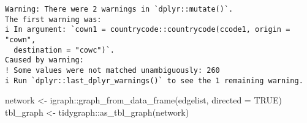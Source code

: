 \documentclass[
  12,
  letterpaper,
  DIV=11,
  numbers=noendperiod]{scrartcl}
\newenvironment{Shaded}{\begin{snugshade}}{\end{snugshade}}
\newcommand{\AttributeTok}[1]{\textcolor[rgb]{0.40,0.45,0.13}{#1}}
\newcommand{\ConstantTok}[1]{\textcolor[rgb]{0.56,0.35,0.01}{#1}}
\newcommand{\FunctionTok}[1]{\textcolor[rgb]{0.28,0.35,0.67}{#1}}
\newcommand{\NormalTok}[1]{\textcolor[rgb]{0.00,0.23,0.31}{#1}}
\newcommand{\OtherTok}[1]{\textcolor[rgb]{0.00,0.23,0.31}{#1}}
\newcommand{\SpecialCharTok}[1]{\textcolor[rgb]{0.37,0.37,0.37}{#1}}
\begin{document}
\begin{verbatim}
Warning: There were 2 warnings in `dplyr::mutate()`.
The first warning was:
i In argument: `cown1 = countrycode::countrycode(ccode1, origin = "cown",
  destination = "cowc")`.
Caused by warning:
! Some values were not matched unambiguously: 260
i Run `dplyr::last_dplyr_warnings()` to see the 1 remaining warning.
\end{verbatim}

\begin{Shaded}
\begin{Highlighting}[numbers=left,,]
\NormalTok{network }\OtherTok{\textless{}{-}}\NormalTok{ igraph}\SpecialCharTok{::}\FunctionTok{graph\_from\_data\_frame}\NormalTok{(edgelist, }\AttributeTok{directed =} \ConstantTok{TRUE}\NormalTok{)}
\NormalTok{tbl\_graph }\OtherTok{\textless{}{-}}\NormalTok{ tidygraph}\SpecialCharTok{::}\FunctionTok{as\_tbl\_graph}\NormalTok{(network)}


\end{Highlighting}
\end{Shaded}
\end{document}
